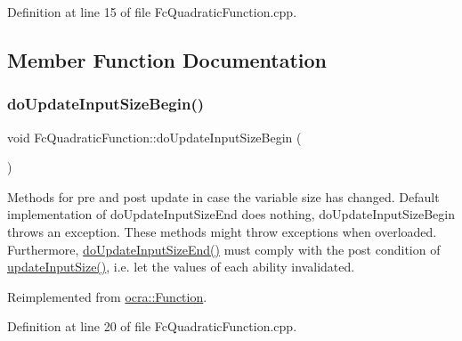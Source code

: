 Definition at line 15 of file Fc\+Quadratic\+Function.\+cpp.



\subsection{Member Function Documentation}
\hypertarget{classocra_1_1FcQuadraticFunction_a1e350f138eb82cfe3e8cf049942e626c}{}\label{classocra_1_1FcQuadraticFunction_a1e350f138eb82cfe3e8cf049942e626c} 
\subsubsection{\texorpdfstring{do\+Update\+Input\+Size\+Begin()}{doUpdateInputSizeBegin()}}
{\footnotesize\ttfamily void Fc\+Quadratic\+Function\+::do\+Update\+Input\+Size\+Begin (\begin{DoxyParamCaption}{ }\end{DoxyParamCaption})\hspace{0.3cm}{\ttfamily [virtual]}}

Methods for pre and post update in case the variable size has changed. Default implementation of do\+Update\+Input\+Size\+End does nothing, do\+Update\+Input\+Size\+Begin throws an exception. These methods might throw exceptions when overloaded. Furthermore, {\ttfamily \hyperlink{classocra_1_1QuadraticFunction_ab3d5478fd8ded343453e0489c595e580}{do\+Update\+Input\+Size\+End()}} must comply with the post condition of {\ttfamily \hyperlink{classocra_1_1Function_a3a5b9e6ae296339acc87ab2cbf97ef98}{update\+Input\+Size()}}, i.\+e. let the values of each ability invalidated. 

Reimplemented from \hyperlink{classocra_1_1Function_a3f728f3758e6448aa59932853db5ddcc}{ocra\+::\+Function}.



Definition at line 20 of file Fc\+Quadratic\+Function.\+cpp.

\hypertarget{classocra_1_1FcQuadraticFunction_aef068bc86027f29c0fbfaa9d53441cd4}{}\label{classocra_1_1FcQuadraticFunction_aef068bc86027f29c0fbfaa9d53441cd4} 
